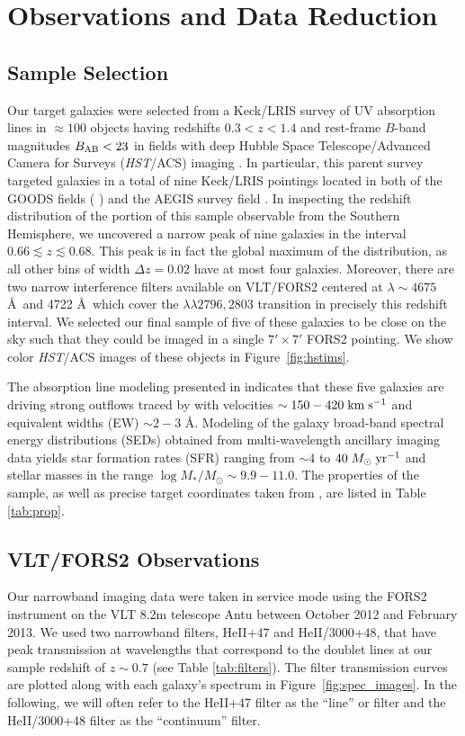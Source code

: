 \documentclass[twocolumn]{aastex62}
\def \mkms {{\rm \; km\;s^{-1}}}
\def \msunperyr {{\; M_{\odot}\rm \;yr^{-1}}}
\begin{document}
\section{Observations and Data Reduction}\label{sec:obs_red}
\subsection{Sample Selection}
Our target galaxies were selected from a Keck/LRIS survey of UV absorption lines in $\approx 100$ objects having redshifts $0.3< z < 1.4$ and rest-frame $B$-band magnitudes $B_{\rm AB}< 23$ in fields with deep Hubble Space Telescope/Advanced Camera for Surveys (\emph{HST}/ACS) imaging \citep{Rubin_2014}.  In particular, this parent survey targeted galaxies in a total of nine Keck/LRIS pointings located in both of the GOODS fields (\citeauthor{Giavalisco2004} \citeyear{Giavalisco2004}) and the AEGIS survey field \citep[the Extended Groth Strip;][]{Davis2007}.  In inspecting the redshift distribution of the portion of this sample observable from the Southern Hemisphere, we uncovered a narrow peak of nine galaxies in the interval $0.66 \lesssim z \lesssim 0.68$.  This peak is in fact the global maximum of the distribution, as all other bins of width $\Delta z = 0.02$ have at most four galaxies.  Moreover, there are two narrow interference filters available on VLT/FORS2 centered at $\lambda \sim 4675$ \AA\ and 4722 \AA\ which cover the  $\lambda \lambda 2796, 2803$ transition in precisely this redshift interval.  We selected our final sample of five of these galaxies %
to be close on the sky such that they could be imaged in a single $7' \times 7' $ FORS2 pointing.  
We show color {\it HST}/ACS images of these objects in Figure~\ref{fig:hstims}.

The absorption line modeling presented in \cite{Rubin_2014} indicates that these five galaxies are driving strong outflows traced by   with velocities $\sim150-420\mkms$ and equivalent widths (EW) $\sim 2-3$ \AA.  Modeling of the galaxy broad-band spectral energy distributions (SEDs) obtained from multi-wavelength ancillary imaging data yields star formation rates (SFR) ranging from $\sim4$ to $40\msunperyr$ and stellar masses in the range $\log M_*/M_{\odot}\sim 9.9-11.0$. The properties of the sample, as well as precise target coordinates taken from \cite{Rubin_2014}, are listed in Table \ref{tab:prop}. 


\subsection{VLT/FORS2 Observations}
Our narrowband imaging data were taken in service mode using the FORS2 instrument on the VLT 8.2m telescope Antu between October 2012 and February 2013. 
We used two narrowband filters, HeII+47 and HeII/3000+48, that have peak transmission at wavelengths that correspond to the  doublet lines at our sample redshift of $z\sim0.7$ (see Table \ref{tab:filters}). The filter transmission curves are plotted along with each galaxy's spectrum in Figure~\ref{fig:spec_images}.
In the following, we will often refer to the HeII+47 filter as the ``line'' or  filter and the HeII/3000+48 filter as the ``continuum'' filter.
\end{document}
